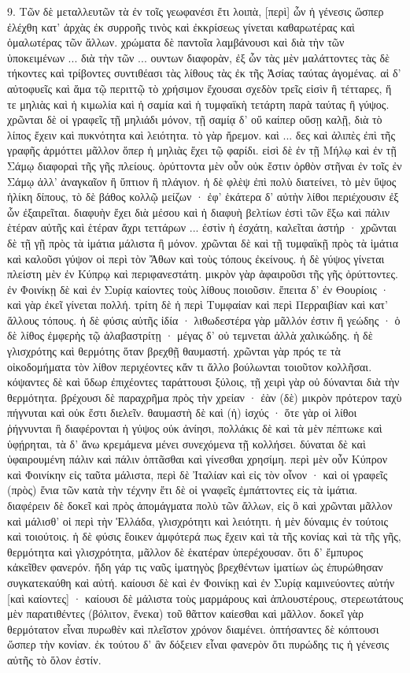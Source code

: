 \documentclass[a4paper, 11pt, oneside, polutonikogreek, german]{article}
\begin{document}
9. Τῶν δὲ μεταλλευτῶν τὰ ἐν τοῖς γεωφανέσι ἔτι λοιπὰ, [περὶ] ὧν ἡ γένεσις ὥσπερ ἐλέχθη κατ' ἀρχὰς ἐκ συρροῆς τινὸς καὶ ἐκκρίσεως γίνεται καθαρωτέρας καὶ ὁμαλωτέρας τῶν ἄλλων. χρώματα δὲ παντοῖα λαμβάνουσι καὶ διὰ τὴν τῶν ὑποκειμένων ... διὰ τὴν τῶν ... ουντων διαφορὰν, ἐξ ὧν τὰς μὲν μαλάττοντες τὰς δὲ τήκοντες καὶ τρίβοντες συντιθέασι τὰς λίθους τὰς ἐκ τῆς Ἀσίας ταύτας ἀγομένας. αἱ δ' αὐτοφυεῖς καὶ ἅμα τῷ περιττῷ τὸ χρήσιμον ἔχουσαι σχεδὸν τρεῖς εἰσὶν ἢ τέτταρες, ἥ τε μηλιὰς καὶ ἡ κιμωλία καὶ ἡ σαμία καὶ ἡ τυμφαϊκὴ τετάρτη παρὰ ταύτας ἢ γύψος. χρῶνται δὲ οἱ γραφεῖς τῇ μηλιάδι μόνον, τῇ σαμίᾳ δ' οὔ καίπερ οὔσῃ καλῇ, διὰ τὸ λίπος ἔχειν καὶ πυκνότητα καὶ λειότητα. τὸ γὰρ ἤρεμον. καὶ ... δες καὶ ἀλιπὲς ἐπὶ τῆς γραφῆς ἁρμόττει μᾶλλον ὅπερ ἡ μηλιὰς ἔχει τῷ φαρίδι. εἰσὶ δὲ ἐν τῇ Μήλῳ καὶ ἐν τῇ Σάμῳ διαφοραὶ τῆς γῆς πλείους. ὀρύττοντα μὲν οὖν οὐκ ἔστιν ὀρθὸν στῆναι ἐν τοῖς ἐν Σάμῳ ἀλλ' ἀναγκαῖον ἢ ὕπτιον ἢ πλάγιον. ἡ δὲ φλὲψ ἐπὶ πολὺ διατείνει, τὸ μὲν ὕψος ἡλίκη δίπους, τὸ δὲ βάθος κολλῷ μείζων · ἐφ' ἑκάτερα δ' αὐτὴν λίθοι περιέχουσιν ἐξ ὧν ἐξαιρεῖται. διαφυὴν ἔχει διὰ μέσου καὶ ἡ διαφυὴ βελτίων ἐστὶ τῶν ἔξω καὶ πάλιν ἑτέραν αὐτῆς καὶ ἑτέραν ἄχρι τεττάρων ... ἐστὶν ἡ ἐσχάτη, καλεῖται ἀστήρ · χρῶνται δὲ τῇ γῇ πρὸς τὰ ἱμάτια μάλιστα ἢ μόνον. χρῶνται δὲ καὶ τῇ τυμφαϊκῇ πρὸς τὰ ἱμάτια καὶ καλοῦσι γύψον οἱ περὶ τὸν Ἄθων καὶ τοὺς τόπους ἐκείνους. ἡ δὲ γύψος γίνεται πλείστη μὲν ἐν Κύπρῳ καὶ περιφανεστάτη. μικρὸν γὰρ ἀφαιροῦσι τῆς γῆς ὀρύττοντες. ἐν Φοινίκῃ δὲ καὶ ἐν Συρίᾳ καίοντες τοὺς λίθους ποιοῦσιν. ἔπειτα δ' ἐν Θουρίοις · καὶ γὰρ ἐκεῖ γίνεται πολλή. τρίτη δὲ ἡ περὶ Τυμφαίαν καὶ περὶ Περραιβίαν καὶ κατ' ἄλλους τόπους. ἡ δὲ φύσις αὐτῆς ἰδία · λιθωδεστέρα γὰρ μᾶλλόν ἐστιν ἢ γεώδης · ὁ δὲ λίθος ἐμφερὴς τῷ ἀλαβαστρίτῃ · μέγας δ' οὐ τεμνεται ἀλλὰ χαλικώδης. ἡ δὲ γλισχρότης καὶ θερμότης ὅταν βρεχθῇ θαυμαστή. χρῶνται γὰρ πρός τε τὰ οἰκοδομήματα τὸν λίθον περιχέοντες κἄν τι ἄλλο βούλωνται τοιοῦτον κολλῆσαι. κόψαντες δὲ καὶ ὕδωρ ἐπιχέοντες ταράττουσι ξύλοις, τῇ χειρὶ γὰρ οὐ δύνανται διὰ τὴν θερμότητα. βρέχουσι δὲ παραχρῆμα πρὸς τὴν χρείαν · ἐὰν (δὲ) μικρὸν πρότερον ταχὺ πήγνυται καὶ οὐκ ἔστι διελεῖν. θαυμαστὴ δὲ καὶ (ἡ) ἰσχύς · ὅτε γὰρ οἱ λίθοι ῥήγνυνται ἢ διαφέρονται ἡ γύψος οὐκ ἀνίησι, πολλάκις δὲ καὶ τὰ μὲν πέπτωκε καὶ ὑφῄρηται, τὰ δ' ἄνω κρεμάμενα μένει συνεχόμενα τῇ κολλήσει. δύναται δὲ καὶ ὑφαιρουμένη πάλιν καὶ πάλιν ὀπτᾶσθαι καὶ γίνεσθαι χρησίμη. περὶ μὲν οὖν Κύπρον καὶ Φοινίκην εἰς ταῦτα μάλιστα, περὶ δὲ Ἰταλίαν καὶ εἰς τὸν οἶνον · καὶ οἱ γραφεῖς (πρὸς) ἔνια τῶν κατὰ τὴν τέχνην ἔτι δὲ οἱ γναφεῖς ἐμπάττοντες εἰς τὰ ἱμάτια. διαφέρειν δὲ δοκεῖ καὶ πρὸς ἀπομάγματα πολὺ τῶν ἄλλων, εἰς ὃ καὶ χρῶνται μᾶλλον καὶ μάλισθ' οἱ περὶ τὴν Ἑλλάδα, γλισχρότητι καὶ λειότητι. ἡ μὲν δύναμις ἐν τούτοις καὶ τοιούτοις. ἡ δὲ φύσις ἔοικεν ἀμφότερά πως ἔχειν καὶ τὰ τῆς κονίας καὶ τὰ τῆς γῆς, θερμότητα καὶ γλισχρότητα, μᾶλλον δὲ ἑκατέραν ὑπερέχουσαν. ὅτι δ' ἔμπυρος κἀκεῖθεν φανερόν. ἤδη γάρ τις ναῦς ἱματηγὸς βρεχθέντων ἱματίων ὡς ἐπυρώθησαν συγκατεκαύθη καὶ αὐτή. καίουσι δὲ καὶ ἐν Φοινίκῃ καὶ ἐν Συρίᾳ καμινεύοντες αὐτήν [καὶ καίοντες] · καίουσι δὲ μάλιστα τοὺς μαρμάρους καὶ ἁπλουστέρους, στερεωτάτους μὲν παρατιθέντες (βόλιτον, ἕνεκα) τοῦ θᾶττον καίεσθαι καὶ μᾶλλον. δοκεῖ γὰρ θερμότατον εἶναι πυρωθὲν καὶ πλεῖστον χρόνον διαμένει. ὀπτήσαντες δὲ κόπτουσι ὥσπερ τὴν κονίαν. ἐκ τούτου δ' ἂν δόξειεν εἶναι φανερὸν ὅτι πυρώδης τις ἡ γένεσις αὐτῆς τὸ ὅλον ἐστίν.
\clearpage
\end{document}
